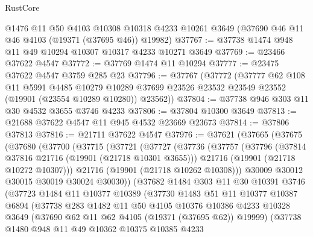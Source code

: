 \begin{lexlean}{RustCore}
\begin{coremodule}
    @1476
    @11
    @50
    @4103
    @10308
    @10318
    @4233
    @10261
    @3649
    (@37690 @46 @11 @46 @4103 (@19371 (@37695 @46)) @19982)
@37767 := @37738 @1474 @948 @11 @49 @10294 @10307 @10317 @4233 @10271 @3649
@37769 := @23466 @37622 @4547
@37772 := @37769 @1474 @11 @10294
@37777 := @23475 @37622 @4547 @3759 @285 @23
@37796 := @37767
    (@37772
      (@37777
        @62
        @108
        @11
        @5991
        @4485
        @10279
        @10289
        @37699
        @23526
        @23532
        @23549
        @23552
        (@19901 (@23554 @10289 @10280))
        @23562))
@37804 := @37738 @946 @303 @11 @30 @4532 @3655 @3746 @4233
@37806 := @37804 @10300 @3649
@37813 := @21688 @37622 @4547 @11 @945 @4532 @23669 @23673
@37814 := @37806 @37813
@37816 := @21711 @37622 @4547
@37976 := @37621
    (@37665
      (@37675
        (@37680
          (@37700
            (@37715
              (@37721
                (@37727
                  (@37736
                    (@37757
                      (@37796
                        (@37814 @37816 @21716 (@19901 (@21718 @10301 @3655)))
                        @21716
                        (@19901 (@21718 @10272 @10307)))
                      @21716
                      (@19901 (@21718 @10262 @10308)))
                    @30009
                    @30012
                    @30015
                    @30019
                    @30024
                    @30030))
                (@37682
                  @1484
                  @303
                  @11
                  @30
                  @10391
                  @3746
                  (@37723
                    @1484
                    @11
                    @10377
                    @10389
                    (@37730
                      @1483
                      @51
                      @11
                      @10377
                      @10387
                      @6894
                      (@37738
                        @283
                        @1482
                        @11
                        @50
                        @4105
                        @10376
                        @10386
                        @4233
                        @10328
                        @3649
                        (@37690 @62 @11 @62 @4105 (@19371 (@37695 @62)) @19999)
                        (@37738
                          @1480
                          @948
                          @11
                          @49
                          @10362
                          @10375
                          @10385
                          @4233

\end{coremodule}
\end{lexlean}
